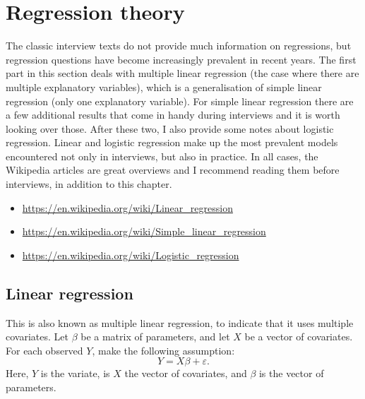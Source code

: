 \documentclass[a4paper]{article}
\begin{document}

\section{Regression theory}
\label{sec:regressiontheory}
The classic interview texts do not provide much information on regressions, but regression questions have become increasingly prevalent in recent years.
The first part in this section deals with multiple linear regression (the case where there are multiple explanatory variables), which is a generalisation of simple linear regression (only one explanatory variable).
For simple linear regression there are a few additional results that come in handy during interviews and it is worth looking over those.
After these two, I also provide some notes about logistic regression.
Linear and logistic regression make up the most prevalent models encountered not only in interviews, but also in practice.
In all cases, the Wikipedia articles are great overviews and I recommend reading them before interviews, in addition to this chapter.\\
\begin{itemize}
  \item \url{https://en.wikipedia.org/wiki/Linear_regression}
  \item \url{https://en.wikipedia.org/wiki/Simple_linear_regression}
  \item \url{https://en.wikipedia.org/wiki/Logistic_regression}
\end{itemize}

\subsection{Linear regression}
This is also known as multiple linear regression, to indicate that it uses multiple covariates.
Let $\beta$ be a matrix of parameters, and let $X$ be a vector of covariates.
For each observed $Y$, make the following assumption:
\[
  Y = X \beta + \varepsilon
  \text{.}
\]
Here, $Y$ is the variate, is $X$ the vector of covariates, and $\beta$ is the vector of parameters.
\end{document}
